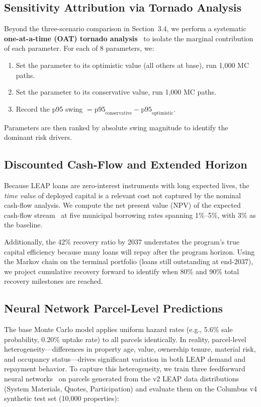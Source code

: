 \documentclass[11pt, letterpaper]{article}
\begin{document}
\subsection{Sensitivity Attribution via Tornado Analysis}

Beyond the three-scenario comparison in Section~3.4, we perform a systematic \textbf{one-at-a-time (OAT) tornado analysis}~\cite{eschenbach1992,saltelli2008} to isolate the marginal contribution of each parameter. For each of 8 parameters, we:
\begin{enumerate}[nosep]
  \item Set the parameter to its optimistic value (all others at base), run 1{,}000 MC paths.
  \item Set the parameter to its conservative value, run 1{,}000 MC paths.
  \item Record the p95 swing $= \text{p95}_{\text{conservative}} - \text{p95}_{\text{optimistic}}$.
\end{enumerate}
Parameters are then ranked by absolute swing magnitude to identify the dominant risk drivers.

\subsection{Discounted Cash-Flow and Extended Horizon}

Because LEAP loans are zero-interest instruments with long expected lives, the \emph{time value} of deployed capital is a relevant cost not captured by the nominal cash-flow analysis. We compute the net present value (NPV) of the expected cash-flow stream~\cite{fabozzi2007} at five municipal borrowing rates spanning 1\%--5\%, with 3\% as the baseline.

Additionally, the 42\% recovery ratio by 2037 understates the program's true capital efficiency because many loans will repay after the program horizon. Using the Markov chain on the terminal portfolio (loans still outstanding at end-2037), we project cumulative recovery forward to identify when 80\% and 90\% total recovery milestones are reached.

\subsection{Neural Network Parcel-Level Predictions}

The base Monte Carlo model applies uniform hazard rates (e.g., 5.6\% sale probability, 0.20\% uptake rate) to all parcels identically. In reality, parcel-level heterogeneity---differences in property age, value, ownership tenure, material risk, and occupancy status---drives significant variation in both LEAP demand and repayment behavior. To capture this heterogeneity, we train three feedforward neural networks~\cite{goodfellow2016} on parcels generated from the v2 LEAP data distributions (System Materials, Quotes, Participation) and evaluate them on the Columbus v4 synthetic test set (10{,}000 properties):
\end{document}
